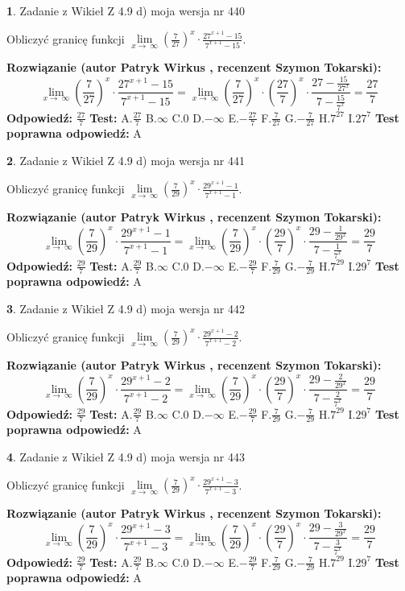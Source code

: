 \documentclass[12pt, a4paper]{article}
\theoremstyle{definition} %
\newtheorem{zad}{}
\newcommand{\zadStart}[1]{\begin{zad}#1\newline}
\newcommand{\zadStop}{\end{zad}}
\newcommand{\rozwStart}[2]{\noindent \textbf{Rozwiązanie (autor #1 , recenzent #2): }\newline}
\newcommand{\rozwStop}{\newline}
\newcommand{\odpStart}{\noindent \textbf{Odpowiedź:}\newline}
\newcommand{\odpStop}{\newline}
\newcommand{\testStart}{\noindent \textbf{Test:}\newline}
\newcommand{\testStop}{\newline}
\newcommand{\kluczStart}{\noindent \textbf{Test poprawna odpowiedź:}\newline}
\newcommand{\kluczStop}{\newline}
\begin{document}
\zadStart{Zadanie z Wikieł Z 4.9 d) moja wersja nr 440}


Obliczyć granicę funkcji  $\lim\limits_{x\to\ \infty}(\frac{7}{27})^{x}\cdot\frac{27^{x+1}-15}{7^{x+1}-15}$.
\zadStop
\rozwStart{Patryk Wirkus}{Szymon Tokarski}
$$\lim\limits_{x\to\ \infty}(\frac{7}{27})^{x}\cdot\frac{27^{x+1}-15}{7^{x+1}-15}=\lim\limits_{x\to\ \infty}(\frac{7}{27})^{x}\cdot(\frac{27}{7})^{x} \cdot \frac{27-\frac{15}{27^{x}}}{7-\frac{15}{7^{x}}} = \frac{27}{7}$$
\rozwStop
\odpStart
$\frac{27}{7}$
\odpStop
\testStart
A.$\frac{27}{7}$ B.$\infty$ C.$0$ D.$-\infty$ E.$-\frac{27}{7}$
F.$\frac{7}{27}$ G.$-\frac{7}{27}$
H.$7^{27}$
I.$27^{7}$
\testStop
\kluczStart
A
\kluczStop



\zadStart{Zadanie z Wikieł Z 4.9 d) moja wersja nr 441}


Obliczyć granicę funkcji  $\lim\limits_{x\to\ \infty}(\frac{7}{29})^{x}\cdot\frac{29^{x+1}-1}{7^{x+1}-1}$.
\zadStop
\rozwStart{Patryk Wirkus}{Szymon Tokarski}
$$\lim\limits_{x\to\ \infty}(\frac{7}{29})^{x}\cdot\frac{29^{x+1}-1}{7^{x+1}-1}=\lim\limits_{x\to\ \infty}(\frac{7}{29})^{x}\cdot(\frac{29}{7})^{x} \cdot \frac{29-\frac{1}{29^{x}}}{7-\frac{1}{7^{x}}} = \frac{29}{7}$$
\rozwStop
\odpStart
$\frac{29}{7}$
\odpStop
\testStart
A.$\frac{29}{7}$ B.$\infty$ C.$0$ D.$-\infty$ E.$-\frac{29}{7}$
F.$\frac{7}{29}$ G.$-\frac{7}{29}$
H.$7^{29}$
I.$29^{7}$
\testStop
\kluczStart
A
\kluczStop



\zadStart{Zadanie z Wikieł Z 4.9 d) moja wersja nr 442}


Obliczyć granicę funkcji  $\lim\limits_{x\to\ \infty}(\frac{7}{29})^{x}\cdot\frac{29^{x+1}-2}{7^{x+1}-2}$.
\zadStop
\rozwStart{Patryk Wirkus}{Szymon Tokarski}
$$\lim\limits_{x\to\ \infty}(\frac{7}{29})^{x}\cdot\frac{29^{x+1}-2}{7^{x+1}-2}=\lim\limits_{x\to\ \infty}(\frac{7}{29})^{x}\cdot(\frac{29}{7})^{x} \cdot \frac{29-\frac{2}{29^{x}}}{7-\frac{2}{7^{x}}} = \frac{29}{7}$$
\rozwStop
\odpStart
$\frac{29}{7}$
\odpStop
\testStart
A.$\frac{29}{7}$ B.$\infty$ C.$0$ D.$-\infty$ E.$-\frac{29}{7}$
F.$\frac{7}{29}$ G.$-\frac{7}{29}$
H.$7^{29}$
I.$29^{7}$
\testStop
\kluczStart
A
\kluczStop



\zadStart{Zadanie z Wikieł Z 4.9 d) moja wersja nr 443}


Obliczyć granicę funkcji  $\lim\limits_{x\to\ \infty}(\frac{7}{29})^{x}\cdot\frac{29^{x+1}-3}{7^{x+1}-3}$.
\zadStop
\rozwStart{Patryk Wirkus}{Szymon Tokarski}
$$\lim\limits_{x\to\ \infty}(\frac{7}{29})^{x}\cdot\frac{29^{x+1}-3}{7^{x+1}-3}=\lim\limits_{x\to\ \infty}(\frac{7}{29})^{x}\cdot(\frac{29}{7})^{x} \cdot \frac{29-\frac{3}{29^{x}}}{7-\frac{3}{7^{x}}} = \frac{29}{7}$$
\rozwStop
\odpStart
$\frac{29}{7}$
\odpStop
\testStart
A.$\frac{29}{7}$ B.$\infty$ C.$0$ D.$-\infty$ E.$-\frac{29}{7}$
F.$\frac{7}{29}$ G.$-\frac{7}{29}$
H.$7^{29}$
I.$29^{7}$
\testStop
\kluczStart
A
\kluczStop
\end{document}

